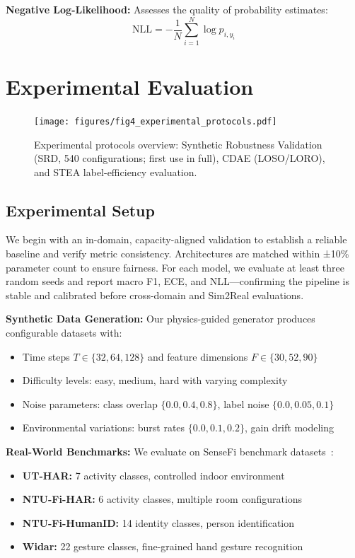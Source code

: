 \documentclass[journal]{IEEEtran}
\begin{document}
\textbf{Negative Log-Likelihood:} Assesses the quality of probability estimates:
\begin{equation}
\text{NLL} = -\frac{1}{N} \sum_{i=1}^{N} \log p_{i,y_i}
\end{equation}

\section{Experimental Evaluation}

\begin{figure}[t]
\centering
\texttt{[image: figures/fig4\_experimental\_protocols.pdf]}
\caption{Experimental protocols overview: Synthetic Robustness Validation (SRD, 540 configurations; first use in full), CDAE (LOSO/LORO), and STEA label-efficiency evaluation.}
\label{fig:protocols}
\end{figure}

\subsection{Experimental Setup}

We begin with an in-domain, capacity-aligned validation to establish a reliable baseline and verify metric consistency. Architectures are matched within ±10\% parameter count to ensure fairness. For each model, we evaluate at least three random seeds and report macro F1, ECE, and NLL—confirming the pipeline is stable and calibrated before cross-domain and Sim2Real evaluations.


\textbf{Synthetic Data Generation:} Our physics-guided generator produces configurable datasets with:
\begin{itemize}
\item Time steps $T \in \{32, 64, 128\}$ and feature dimensions $F \in \{30, 52, 90\}$
\item Difficulty levels: easy, medium, hard with varying complexity
\item Noise parameters: class overlap $\{0.0, 0.4, 0.8\}$, label noise $\{0.0, 0.05, 0.1\}$
\item Environmental variations: burst rates $\{0.0, 0.1, 0.2\}$, gain drift modeling
\end{itemize}

\textbf{Real-World Benchmarks:} We evaluate on SenseFi benchmark datasets~\cite{yang2023sensefi}:
\begin{itemize}
\item \textbf{UT-HAR:} 7 activity classes, controlled indoor environment
\item \textbf{NTU-Fi-HAR:} 6 activity classes, multiple room configurations
\item \textbf{NTU-Fi-HumanID:} 14 identity classes, person identification
\item \textbf{Widar:} 22 gesture classes, fine-grained hand gesture recognition
\end{itemize}
\end{document}
